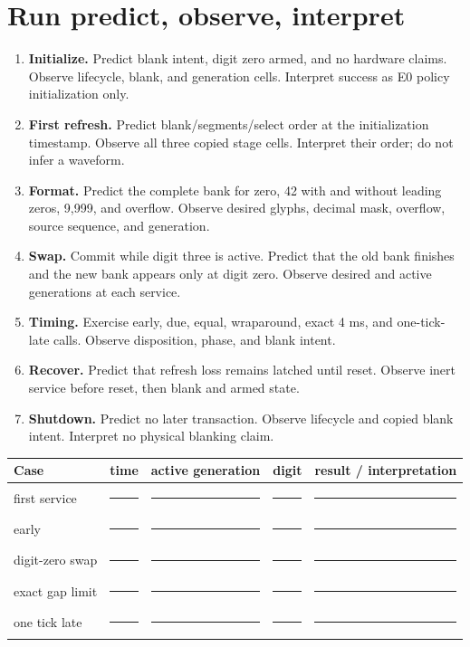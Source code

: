 \documentclass[10pt]{article}
\newcommand{\blankline}{\rule{0.76in}{0.4pt}}
\newcommand{\longblank}{\rule{1.28in}{0.4pt}}
\begin{document}
\section{Run predict, observe, interpret}
\begin{enumerate}
 \item \textbf{Initialize.} Predict blank intent, digit zero armed, and no
       hardware claims. Observe lifecycle, blank, and generation cells.
       Interpret success as E0 policy initialization only.
 \item \textbf{First refresh.} Predict blank/segments/select order at the
       initialization timestamp. Observe all three copied stage cells.
       Interpret their order; do not infer a waveform.
 \item \textbf{Format.} Predict the complete bank for zero, 42 with and
       without leading zeros, 9,999, and overflow. Observe desired glyphs,
       decimal mask, overflow, source sequence, and generation.
 \item \textbf{Swap.} Commit while digit three is active. Predict that the old
       bank finishes and the new bank appears only at digit zero. Observe
       desired and active generations at each service.
 \item \textbf{Timing.} Exercise early, due, equal, wraparound, exact 4 ms,
       and one-tick-late calls. Observe disposition, phase, and blank intent.
 \item \textbf{Recover.} Predict that refresh loss remains latched until
       reset. Observe inert service before reset, then blank and armed state.
 \item \textbf{Shutdown.} Predict no later transaction. Observe lifecycle and
       copied blank intent. Interpret no physical blanking claim.
\end{enumerate}

\begin{tabularx}{\linewidth}{@{}l l l l X@{}}
\toprule
Case & time & active generation & digit & result / interpretation\\
\midrule
first service & \blankline & \blankline & \blankline & \longblank\\[7pt]
early & \blankline & \blankline & \blankline & \longblank\\[7pt]
digit-zero swap & \blankline & \blankline & \blankline & \longblank\\[7pt]
exact gap limit & \blankline & \blankline & \blankline & \longblank\\[7pt]
one tick late & \blankline & \blankline & \blankline & \longblank\\
\bottomrule
\end{tabularx}
\end{document}
